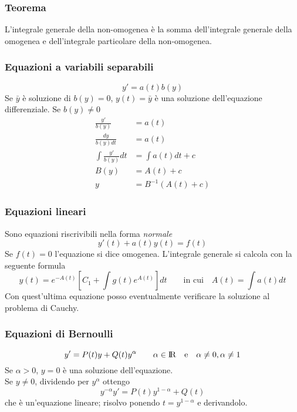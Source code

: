 \documentclass[10pt,a4paper,fleqn]{article}
\begin{document}
	\subsubsection{Teorema}
	L'integrale generale della non-omogenea è la somma dell'integrale generale della omogenea e dell'integrale particolare della non-omogenea.

	\subsubsection{Equazioni a variabili separabili}
	\begin{equation}
		y' = a(t)b(y)
	\end{equation}
	Se $\bar y$ è soluzione di $b(y) = 0$, $y(t) = \bar y$ è una soluzione dell'equazione differenziale.
	Se $b(y) \not = 0$
	\begin{align*}
		\frac{y'}{b(y)} &=a(t)\\
		\frac{dy}{b(y)dt} &= a(t)\\
		\int \frac{y'}{b(y)}dt &= \int a(t)dt + c\\
		B(y) &= A(t) + c\\
		y &= B^{-1}(A(t)+c)
	\end{align*}
	
	\subsubsection{Equazioni lineari}
	Sono equazioni riscrivibili nella forma \emph{normale}
	\begin{equation}
		y'(t) + a(t)y(t) = f(t)
	\end{equation}
	Se $f(t) = 0$ l'equazione si dice omogenea.
	L'integrale generale si calcola con la seguente formula
	\begin{equation}
		y(t)=e^{-A(t)}\left[C_1 + \int g(t)e^{A(t)}\right]dt \qquad \text{in cui}\quad A(t) = \int a(t)dt
	\end{equation}
	Con quest'ultima equazione posso eventualmente verificare la soluzione al problema di Cauchy.

	\subsubsection{Equazioni di Bernoulli}
	\begin{equation}
		y' = P(t)y + Q(t)y^\alpha \qquad \alpha \in \rm I\!R \quad\text{e}\quad \alpha \not = 0, \alpha \not = 1
	\end{equation}
	Se $\alpha > 0$, $y=0$ è una soluzione dell'equazione.\\
	Se $y\not = 0$, dividendo per $y^\alpha$ ottengo
	\begin{equation}
		y^{-\alpha}y' = P(t)y^{1-\alpha} + Q(t)
	\end{equation}
	che è un'equazione lineare; risolvo ponendo $t=y^{1-\alpha}$ e derivandolo.
\end{document}
